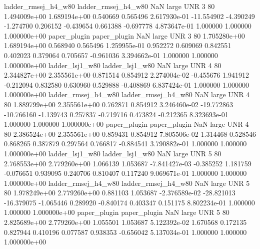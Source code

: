 ladder_rmsej_h4_w80 ladder_rmsej_h4_w80                   NaN      large      UNR                 3 80 1.494009e+00   1.689194e+00      0.540669       0.565496  2.617930e-01    -11.554902     -4.390249    -1.274700       0.206152 -0.439654   0.661388    -0.697778   4.873647e-01            1.000000        1.000000        1.000000e+00
       paper_plugin        paper_plugin                   NaN      large      UNR                 3 80 1.705280e+00   1.689194e+00      0.568940       0.565496  1.259955e-01      0.952272      0.609069     0.842551       0.402023  0.379064   0.705657    -0.961036   3.394662e-01            1.000000        1.000000        1.000000e+00
    ladder_lsj1_w80     ladder_lsj1_w80                   NaN      large      UNR                 4 80 2.344827e+00   2.355561e+00      0.871514       0.854912  2.274004e-02     -0.455676      1.941912    -0.212094       0.832580  0.630960   0.529888    -0.408869   6.837424e-01            1.000000        1.000000        1.000000e+00
ladder_rmsej_h4_w80 ladder_rmsej_h4_w80                   NaN      large      UNR                 4 80 1.889799e+00   2.355561e+00      0.762871       0.854912  3.246460e-02    -19.772863    -10.766160    -1.139743       0.257837 -0.719716   0.473824    -0.212365   8.323693e-01            1.000000        1.000000        1.000000e+00
       paper_plugin        paper_plugin                   NaN      large      UNR                 4 80 2.386524e+00   2.355561e+00      0.859431       0.854912  7.805506e-02      1.314468      0.528546     0.868265       0.387879  0.297564   0.766817    -0.884541   3.790882e-01            1.000000        1.000000        1.000000e+00
    ladder_lsj1_w80     ladder_lsj1_w80                   NaN      large      UNR                 5 80 2.768553e+00   2.779260e+00      1.066139       1.053687 -7.841427e-03     -0.385252      1.181759    -0.076651       0.939095  0.240706   0.810407     0.117240   9.069671e-01            1.000000        1.000000        1.000000e+00
ladder_rmsej_h4_w80 ladder_rmsej_h4_w80                   NaN      large      UNR                 5 80 1.978249e+00   2.779260e+00      0.881103       1.053687 -2.376589e-02    -28.821013    -16.379075    -1.065446       0.289920 -0.840174   0.403347     0.151175   8.802234e-01            1.000000        1.000000        1.000000e+00
       paper_plugin        paper_plugin                   NaN      large      UNR                 5 80 2.825689e+00   2.779260e+00      1.055501       1.053687  5.122392e-02      1.670568      0.172135     0.827944       0.410196  0.077587   0.938353    -0.656042   5.137034e-01            1.000000        1.000000        1.000000e+00
